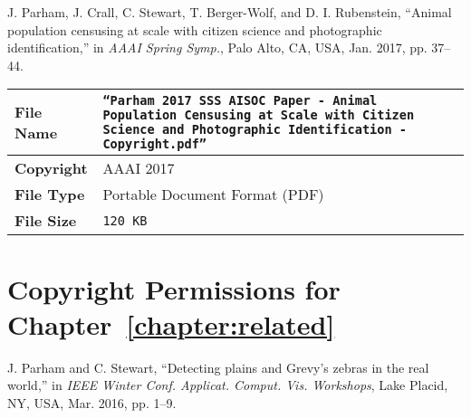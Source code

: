 \begin{tcolorbox}
    J. Parham, J. Crall, C. Stewart, T. Berger-Wolf, and D. I. Rubenstein, ``Animal population censusing at scale with citizen science and photographic identification,'' in \textit{AAAI Spring Symp.}, Palo Alto, CA, USA, Jan. 2017, pp. 37–44.
\end{tcolorbox}

\begin{table*}[!ht]
    \begin{center}
        \begin{tabular}{| l | p{13.5cm} |}
            \hline
            \textbf{File Name} & \texttt{``Parham 2017 SSS AISOC Paper - Animal Population Censusing at Scale with Citizen Science and Photographic Identification - Copyright.pdf''} \\
            \hline
            \textbf{Copyright} & AAAI 2017                                                                                                                                            \\
            \hline
            \textbf{File Type} & Portable Document Format (PDF)                                                                                                                       \\
            \hline
            \textbf{File Size} & \texttt{120 KB}                                                                                                                                      \\
            \hline
        \end{tabular}
    \end{center}
\end{table*}

\newpage

\section{Copyright Permissions for Chapter~\ref{chapter:related}}

\begin{tcolorbox}
    J. Parham and C. Stewart, ``Detecting plains and Grevy’s zebras in the real world,'' in \textit{IEEE Winter Conf. Applicat. Comput. Vis. Workshops}, Lake Placid, NY, USA, Mar. 2016, pp. 1–9.
\end{tcolorbox}

